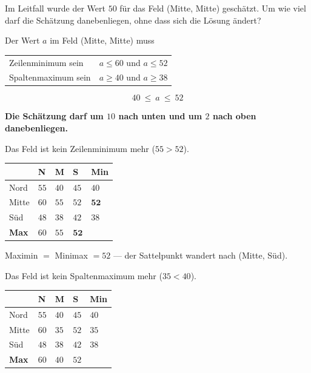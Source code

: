 \begin{aufgabe}
Im Leitfall wurde der Wert $50$ für das Feld (Mitte, Mitte) geschätzt. Um wie viel darf die Schätzung danebenliegen, ohne dass sich die Lösung ändert?

\loesung
{}
Der Wert $a$ im Feld (Mitte, Mitte) muss
\begin{center}
{\small
\renewcommand{\arraystretch}{1.5}
\begin{tabular}{@{}P{3.4cm}P{5.0cm}@{}}
\toprule
Zeilenminimum sein & $a \le 60$ und $a \le 52$\\
Spalten\-maximum sein & $a \ge 40$ und $a \ge 38$\\
\bottomrule
\end{tabular}}
\end{center}

\[ 40 \ \le\ a \ \le\ 52 \]

\begin{center}
\begin{minipage}{0.9\textwidth}
\textbf{Die Schätzung darf um $10$ nach unten und um $2$ nach oben danebenliegen.}
\end{minipage}
\end{center}

 Das Feld ist kein Zeilenminimum mehr ($55 > 52$).
\begin{center}
\renewcommand{\arraystretch}{1.46}
\begin{tabular}{@{}P{1.8cm}P{1.2cm}P{1.2cm}P{1.2cm}P{1.6cm}@{}}
\toprule
& N & M & S & \textbf{Min}\\
\midrule
Nord & $55$ & $40$ & $45$ & $40$\\
Mitte & $60$ & $55$ & $52$ & $\mathbf{52}$\\
Süd & $48$ & $38$ & $42$ & $38$\\
\midrule
\textbf{Max} & $60$ & $55$ & $\mathbf{52}$ & \\
\bottomrule
\end{tabular}
\end{center}

Maximin $=$ Minimax $= 52$ --- der Sattelpunkt wandert nach (Mitte, Süd).

 Das Feld ist kein Spaltenmaximum mehr ($35 < 40$).
\begin{center}
\renewcommand{\arraystretch}{1.46}
\begin{tabular}{@{}P{1.8cm}P{1.2cm}P{1.2cm}P{1.2cm}P{1.6cm}@{}}
\toprule
& N & M & S & \textbf{Min}\\
\midrule
Nord & $55$ & $40$ & $45$ & $40$\\
Mitte & $60$ & $35$ & $52$ & $35$\\
Süd & $48$ & $38$ & $42$ & $38$\\
\midrule
\textbf{Max} & $60$ & $40$ & $52$ & \\
\bottomrule
\end{tabular}
\end{center}


\end{aufgabe}
